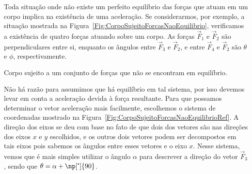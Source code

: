 Toda situação onde não existe um perfeito equilíbrio das forças que atuam em um corpo implica na existência de uma aceleração. Se considerarmos, por exemplo, a situação mostrada na Figura~\ref{Fig:CorpoSujeitoForcasNaoEquilibrio}, verificamos a existência de quatro forças atuando sobre um corpo. As forças $\vec{F}_1$ e $\vec{F}_2$ são perpendiculares entre si, enquanto os ângulos entre $\vec{F}_3$ e $\vec{F}_2$, e entre $\vec{F}_4$ e $\vec{F}_2$ são $\theta$ e $\phi$, respectivamente. 

\begin{marginfigure}
\centering
{}
\caption{Corpo sujeito a um conjunto de forças que não se encontram em equilíbrio.\label{Fig:CorpoSujeitoForcasNaoEquilibrio}}
\end{marginfigure}

Não há razão para assumimos que há equilíbrio em tal sistema, por isso devemos levar em conta a aceleração devida à força resultante. Para que possamos determinar o vetor aceleração mais facilmente, escolhemos o sistema de coordenadas mostrado na Figura~\ref{Fig:CorpoSujeitoForcasNaoEquilibrioRef}. A direção dos eixos se deu com base no fato de que dois dos vetores são nas direções dos eixos $x$ e $y$ escolhidos, e os outros dois vetores podem ser decompostos em tais eixos pois sabemos os ângulos entre esses vetores e o eixo $x$. Nesse sistema, vemos que é mais simples utilizar o ângulo $\alpha$ para descrever a direção do vetor $\vec{F}_3$, sendo que $\theta = \alpha + \np[\tcdegree]{90}$.

